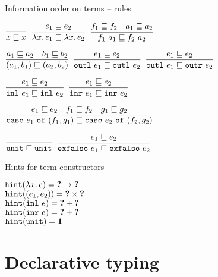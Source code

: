 \documentclass{beamer}
\begin{document}
\begin{frame}{Information order on terms -- rules}

\begin{center}
  $\displaystyle \frac{}{x \sqsubseteq x} \textsc{\footnotesize{}}$ \quad
  $\displaystyle \frac{e_1 \sqsubseteq e_2}{\lambda x.\, e_1 \sqsubseteq \lambda x.\, e_2} \textsc{\footnotesize{}}$ \quad
  $\displaystyle \frac{f_1 \sqsubseteq f_2 \quad a_1 \sqsubseteq a_2}{f_1\ a_1 \sqsubseteq f_2\ a_2} \textsc{\footnotesize{}}$

  \vspace{2em}

  $\displaystyle \frac{a_1 \sqsubseteq a_2 \quad b_1 \sqsubseteq b_2}{(a_1, b_1) \sqsubseteq (a_2, b_2)} \textsc{\footnotesize{}}$ \quad
  $\displaystyle \frac{e_1 \sqsubseteq e_2}{\texttt{outl}\ e_1 \sqsubseteq \texttt{outl}\ e_2} \textsc{\footnotesize{}}$ \quad
  $\displaystyle \frac{e_1 \sqsubseteq e_2}{\texttt{outl}\ e_1 \sqsubseteq \texttt{outr}\ e_2} \textsc{\footnotesize{}}$

  \vspace{2em}

  $\displaystyle \frac{e_1 \sqsubseteq e_2}{\texttt{inl}\ e_1 \sqsubseteq \texttt{inl}\ e_2} \textsc{\footnotesize{}}$ \quad
  $\displaystyle \frac{e_1 \sqsubseteq e_2}{\texttt{inr}\ e_1 \sqsubseteq \texttt{inr}\ e_2} \textsc{\footnotesize{}}$

  \vspace{2em}

  $\displaystyle \frac{e_1 \sqsubseteq e_2 \quad f_1 \sqsubseteq f_2 \quad g_1 \sqsubseteq g_2}{\texttt{case}\ e_1\ \texttt{of}\ (f_1, g_1) \sqsubseteq \texttt{case}\ e_2\ \texttt{of}\ (f_2, g_2)} \textsc{\footnotesize{}}$

  \vspace{2em}

  $\displaystyle \frac{}{\texttt{unit} \sqsubseteq \texttt{unit}} \textsc{\footnotesize{}}$ \quad
  $\displaystyle \frac{e_1 \sqsubseteq e_2}{\texttt{exfalso}\ e_1 \sqsubseteq \texttt{exfalso}\ e_2} \textsc{\footnotesize{}}$
\end{center}

\end{frame}

\begin{frame}{Hints for term constructors}

\begin{center}
  $\texttt{hint}(\lambda x.\, e) = \textbf{?} \to \textbf{?}$ \\
  $\texttt{hint}((e_1, e_2)) = \textbf{?} \times \textbf{?}$ \\
  $\texttt{hint}(\texttt{inl}\ e) = \textbf{?} + \textbf{?}$ \\
  $\texttt{hint}(\texttt{inr}\ e) = \textbf{?} + \textbf{?}$ \\
  $\texttt{hint}(\texttt{unit}) = \textbf{1}$
\end{center}

\end{frame}

\section{Declarative typing}
\end{document}
